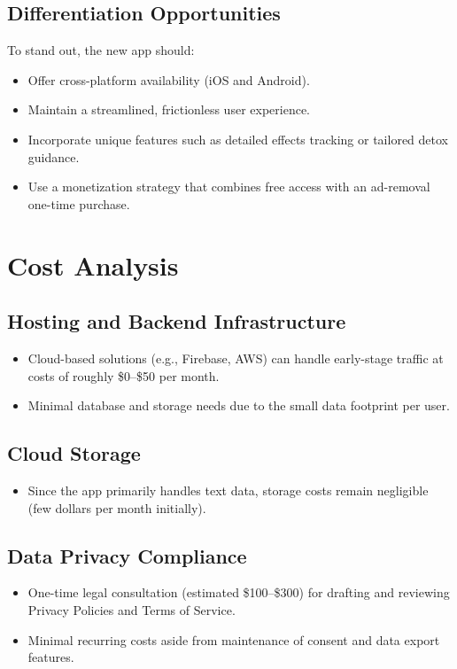 \documentclass[11pt]{article}
\begin{document}
\subsection{Differentiation Opportunities}
To stand out, the new app should:
\begin{itemize}[noitemsep]
    \item Offer cross-platform availability (iOS and Android).
    \item Maintain a streamlined, frictionless user experience.
    \item Incorporate unique features such as detailed effects tracking or tailored detox guidance.
    \item Use a monetization strategy that combines free access with an ad-removal one-time purchase.
\end{itemize}

\section{Cost Analysis}
\subsection{Hosting and Backend Infrastructure}
\begin{itemize}[noitemsep]
    \item Cloud-based solutions (e.g., Firebase, AWS) can handle early-stage traffic at costs of roughly \$0--\$50 per month.
    \item Minimal database and storage needs due to the small data footprint per user.
\end{itemize}

\subsection{Cloud Storage}
\begin{itemize}[noitemsep]
    \item Since the app primarily handles text data, storage costs remain negligible (few dollars per month initially).
\end{itemize}

\subsection{Data Privacy Compliance}
\begin{itemize}[noitemsep]
    \item One-time legal consultation (estimated \$100--\$300) for drafting and reviewing Privacy Policies and Terms of Service.
    \item Minimal recurring costs aside from maintenance of consent and data export features.
\end{itemize}
\end{document}
